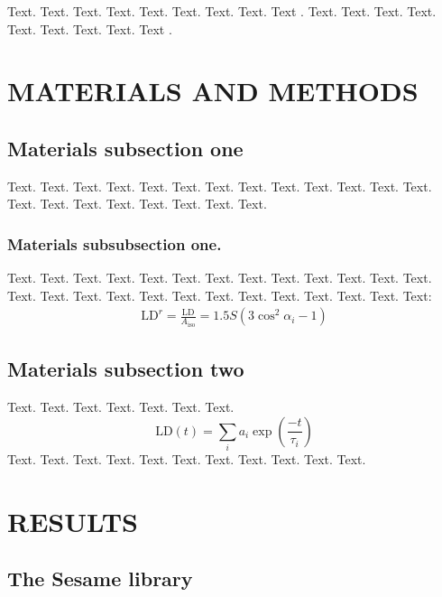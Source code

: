 \documentclass[a4,center,fleqn]{NAR}
\begin{document}
Text. Text. Text. Text. Text. Text. Text. Text. Text \cite{2,3}.
Text. Text. Text. Text. Text. Text. Text. Text. Text \cite{4}.


\section{MATERIALS AND METHODS}

\subsection{Materials subsection one}

Text. Text. Text. Text. Text. Text. Text. Text. Text. Text. Text.
Text. Text. Text. Text. Text. Text. Text. Text. Text. Text.


\subsubsection{Materials subsubsection one.}

Text. Text. Text. Text. Text. Text. Text. Text. Text. Text. Text.
Text. Text. Text. Text. Text. Text. Text. Text. Text. Text. Text.
Text. Text. Text. Text:
\begin{align}
\mathrm{LD}^r = \frac{\mathrm{LD}}{A_\mathrm{iso}}
= 1.5 S \left( 3 \cos^2 \alpha_i - 1 \right)
\end{align}


\subsection{Materials subsection two}


Text. Text. Text. Text. Text. Text. Text.
\begin{equation*}
\mathrm{LD} \left( t \right) =
\sum\limits_i
a_i \exp \left( \frac{-t}{\tau_i} \right)
\end{equation*}
Text. Text. Text. Text. Text. Text. Text. Text. Text. Text. Text.


\section{RESULTS}

\subsection{The Sesame library}

\end{document}
